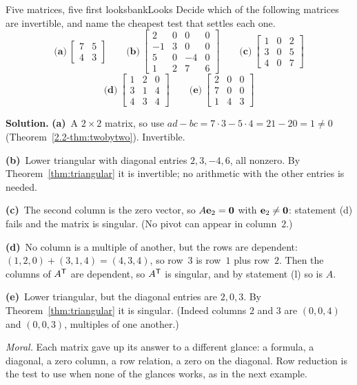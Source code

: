 \documentclass[11pt]{article}
\begin{document}
\begin{exmp}{Five matrices, five first looks}{bankLooks}
Decide which of the following matrices are invertible, and name the cheapest test that settles each one.
\[
\textbf{(a)}\ \begin{bmatrix}7&5\\4&3\end{bmatrix}\qquad
\textbf{(b)}\ \begin{bmatrix}2&0&0&0\\-1&3&0&0\\5&0&-4&0\\1&2&7&6\end{bmatrix}\qquad
\textbf{(c)}\ \begin{bmatrix}1&0&2\\3&0&5\\4&0&7\end{bmatrix}
\]
\[
\textbf{(d)}\ \begin{bmatrix}1&2&0\\3&1&4\\4&3&4\end{bmatrix}\qquad
\textbf{(e)}\ \begin{bmatrix}2&0&0\\7&0&0\\1&4&3\end{bmatrix}
\]

\textbf{Solution.} \textbf{(a)}~A $2\times2$ matrix, so use $ad-bc=7\cdot3-5\cdot4=21-20=1\neq0$ (Theorem~\ref{2.2-thm:twobytwo}). Invertible.

\textbf{(b)}~Lower triangular with diagonal entries $2,3,-4,6$, all nonzero. By Theorem~\ref{thm:triangular} it is invertible; no arithmetic with the other entries is needed.

\textbf{(c)}~The second column is the zero vector, so $A\mathbf{e}_2=\mathbf{0}$ with $\mathbf{e}_2\neq\mathbf{0}$: statement (d) fails and the matrix is singular. (No pivot can appear in column~$2$.)

\textbf{(d)}~No column is a multiple of another, but the rows are dependent: $(1,2,0)+(3,1,4)=(4,3,4)$, so row~$3$ is row~$1$ plus row~$2$. Then the columns of $A^{\mathsf T}$ are dependent, so $A^{\mathsf T}$ is singular, and by statement (l) so is $A$.

\textbf{(e)}~Lower triangular, but the diagonal entries are $2,0,3$. By Theorem~\ref{thm:triangular} it is singular. (Indeed columns $2$ and $3$ are $(0,0,4)$ and $(0,0,3)$, multiples of one another.)

\emph{Moral.} Each matrix gave up its answer to a different glance: a formula, a diagonal, a zero column, a row relation, a zero on the diagonal. Row reduction is the test to use when none of the glances works, as in the next example.
\end{exmp}
\end{document}
